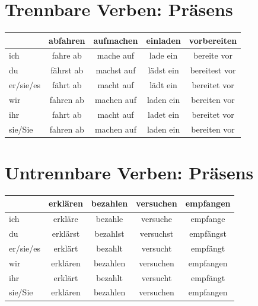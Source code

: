 \section{Trennbare Verben: Präsens}
\label{sec:TrennbarPraesens}

\begin{center}
\begin{tabular}{|l|c|c|c|c|}
\hline
\textbf{} & \textbf{abfahren} & \textbf{aufmachen} & \textbf{einladen} & \textbf{vorbereiten} \\ \hline
ich & fahre ab & mache auf & lade ein & bereite vor \\ \hline
du & fährst ab & machst auf & lädst ein & bereitest vor \\ \hline
er/sie/es & fährt ab & macht auf & lädt ein & bereitet vor \\ \hline
wir & fahren ab & machen auf & laden ein & bereiten vor \\ \hline
ihr & fahrt ab & macht auf & ladet ein & bereitet vor \\ \hline
sie/Sie & fahren ab & machen auf & laden ein & bereiten vor \\ \hline
\end{tabular}
\end{center}

\section{Untrennbare Verben: Präsens}
\label{sec:UntrennbarPraesens}

\begin{center}
\begin{tabular}{|l|c|c|c|c|}
\hline
\textbf{} & \textbf{erklären} & \textbf{bezahlen} & \textbf{versuchen} & \textbf{empfangen} \\ \hline
ich & erkläre & bezahle & versuche & empfange \\ \hline
du & erklärst & bezahlst & versuchst & empfängst \\ \hline
er/sie/es & erklärt & bezahlt & versucht & empfängt \\ \hline
wir & erklären & bezahlen & versuchen & empfangen \\ \hline
ihr & erklärt & bezahlt & versucht & empfängt \\ \hline
sie/Sie & erklären & bezahlen & versuchen & empfangen \\ \hline
\end{tabular}
\end{center}

